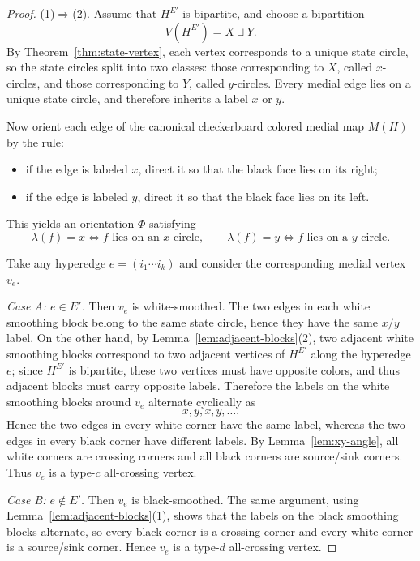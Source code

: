 \documentclass{article}
\begin{document}
\begin{proof}
\noindent(1)$\Rightarrow$(2). Assume that $H^{E'}$ is bipartite, and choose a bipartition
\[
V(H^{E'})=X\sqcup Y.
\]
By Theorem~\ref{thm:state-vertex}, each vertex corresponds to a unique state circle, so the state circles split into two classes: those corresponding to $X$, called $x$-circles, and those corresponding to $Y$, called $y$-circles. Every medial edge lies on a unique state circle, and therefore inherits a label $x$ or $y$.

Now orient each edge of the canonical checkerboard colored medial map $M(H)$ by the rule:
\begin{itemize}
  \item if the edge is labeled $x$, direct it so that the black face lies on its right;
  \item if the edge is labeled $y$, direct it so that the black face lies on its left.
\end{itemize}
This yields an orientation $\Phi$ satisfying
\[
\lambda(f)=x\Longleftrightarrow f\text{ lies on an }x\text{-circle},
\qquad
\lambda(f)=y\Longleftrightarrow f\text{ lies on a }y\text{-circle}.
\]

Take any hyperedge $e=(i_1\cdots i_k)$ and consider the corresponding medial vertex $v_e$.

\emph{Case A: $e\in E'$.} Then $v_e$ is white-smoothed. The two edges in each white smoothing block belong to the same state circle, hence they have the same $x/y$ label. On the other hand, by Lemma~\ref{lem:adjacent-blocks}(2), two adjacent white smoothing blocks correspond to two adjacent vertices of $H^{E'}$ along the hyperedge $e$; since $H^{E'}$ is bipartite, these two vertices must have opposite colors, and thus adjacent blocks must carry opposite labels. Therefore the labels on the white smoothing blocks around $v_e$ alternate cyclically as
\[
x,y,x,y,\dots.
\]
Hence the two edges in every white corner have the same label, whereas the two edges in every black corner have different labels. By Lemma~\ref{lem:xy-angle}, all white corners are crossing corners and all black corners are source/sink corners. Thus $v_e$ is a type-$c$ all-crossing vertex.

\emph{Case B: $e\notin E'$.} Then $v_e$ is black-smoothed. The same argument, using Lemma~\ref{lem:adjacent-blocks}(1), shows that the labels on the black smoothing blocks alternate, so every black corner is a crossing corner and every white corner is a source/sink corner. Hence $v_e$ is a type-$d$ all-crossing vertex.


\end{proof}
\end{document}
